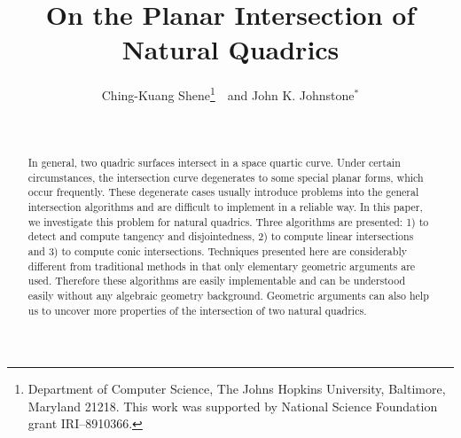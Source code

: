 \title{
     On the Planar Intersection of Natural Quadrics}

\author{Ching-Kuang Shene\thanks
          {Department of Computer Science, The Johns Hopkins University,
          Baltimore, Maryland 21218.  This work was supported by
          National Science Foundation grant IRI--8910366.}\ \ and
        John K. Johnstone${^*}$
       }

\date{\ }

\newtheorem{example}{Example}[section]
\newtheorem{property}{Property}[section]
\newtheorem{definition}{Definition}[section]
\newtheorem{theorem}{Theorem}[section]
\newtheorem{lemma}{Lemma}[section]
\newtheorem{corollary}{Corollary}[section]

\newcommand{\DoubleSpace}{\edef\baselinestretch{1.4}\Large\normalsize}
\newcommand{\QED}{\rule{2mm}{3mm}}

\setlength{\oddsidemargin}{0pt}
\setlength{\evensidemargin}{0pt}
\setlength{\headsep}{0pt}
\setlength{\topmargin}{0pt}
\setlength{\textheight}{8.75in}
\setlength{\textwidth}{6.5in}



\maketitle


\begin{abstract}
     In general, two quadric surfaces intersect in a space quartic curve.
Under certain circumstances, the intersection curve degenerates to  some
special planar forms, which occur frequently.  These degenerate cases usually 
introduce problems into the general intersection algorithms and are difficult 
to implement in a reliable way.  In this paper, we investigate this problem 
for natural quadrics.  Three algorithms are presented: 1) to detect and 
compute tangency and disjointedness, 2) to compute linear intersections and 
3) to compute conic intersections.  Techniques presented here are considerably
different from traditional methods in that only elementary geometric arguments
are used.  Therefore these algorithms are easily implementable and can be 
understood easily without any algebraic geometry background.  Geometric 
arguments can also help us to uncover more properties of the intersection of 
two natural quadrics.
\end{abstract}

